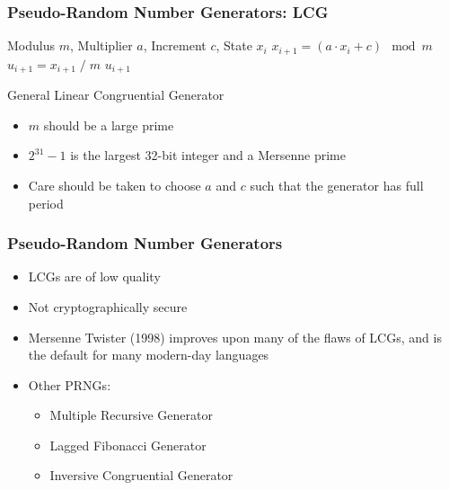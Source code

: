 \documentclass{beamer}
\begin{document}
\begin{frame}
\frametitle{Pseudo-Random Number Generators: LCG}
\begin{algorithm}[H]
\begin{algorithmic}[1]
  \REQUIRE Modulus $m$, Multiplier $a$, Increment $c$, State $x_i$
  \STATE $x_{i+1} = \left( a \cdot x_i + c \right) \mod m$
  \STATE $u_{i+1} = x_{i+1} \; / \; m$
  \ENSURE $u_{i+1}$
\end{algorithmic}
\caption{General Linear Congruential Generator}
\end{algorithm}
\begin{itemize}
  \item $m$ should be a large prime
  \item $2^{31} - 1$ is the largest 32-bit integer and a Mersenne prime
  \item Care should be taken to choose $a$ and $c$ such that the generator has full period
\end{itemize}
\end{frame}


\begin{frame}
  \frametitle{Pseudo-Random Number Generators}
  \begin{itemize}
    \item LCGs are of low quality
    \item Not cryptographically secure
    \item Mersenne Twister (1998) improves upon many of the flaws of LCGs, and is the
      default for many modern-day languages
    \item Other PRNGs:
      \begin{itemize}
        \item Multiple Recursive Generator
        \item Lagged Fibonacci Generator
        \item Inversive Congruential Generator
      \end{itemize}
  \end{itemize}
\end{frame}


\end{document}
